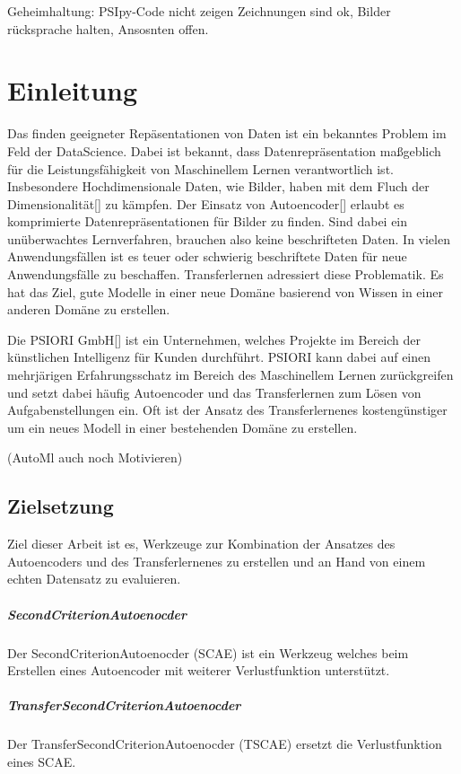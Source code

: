 \listoftodos

Geheimhaltung: PSIpy-Code nicht zeigen Zeichnungen sind ok, Bilder rücksprache halten, Ansosnten offen.
  
\chapter{Einleitung}
\label{chap:Einleitung}
	Das finden geeigneter Repäsentationen von Daten ist ein bekanntes Problem im Feld der DataScience. Dabei ist bekannt, dass Datenrepräsentation maßgeblich für die Leistungsfähigkeit von Maschinellem Lernen verantwortlich ist. Insbesondere Hochdimensionale Daten, wie Bilder, haben mit dem Fluch der Dimensionalität[] zu kämpfen. Der Einsatz von Autoencoder[] erlaubt es komprimierte Datenrepräsentationen für Bilder zu finden. Sind dabei ein unüberwachtes Lernverfahren, brauchen also keine beschrifteten Daten.
	In vielen Anwendungsfällen ist es teuer oder schwierig beschriftete Daten für neue Anwendungsfälle zu beschaffen. Transferlernen adressiert diese Problematik. Es hat das Ziel, gute Modelle in einer neue Domäne basierend von Wissen in einer anderen Domäne zu erstellen.
	
	Die PSIORI GmbH[] ist ein Unternehmen, welches Projekte im Bereich der künstlichen Intelligenz für Kunden durchführt. PSIORI kann dabei auf einen mehrjärigen Erfahrungsschatz im Bereich des Maschinellem Lernen zurückgreifen und setzt dabei häufig Autoencoder und das Transferlernen zum Lösen von Aufgabenstellungen ein. Oft ist der Ansatz des Transferlernenes kostengünstiger um ein neues Modell in einer bestehenden Domäne zu erstellen. 

 	(AutoMl auch noch Motivieren)

	\section{Zielsetzung}
	\label{sec:Zielsetzung}
	Ziel dieser Arbeit ist es, Werkzeuge zur Kombination der Ansatzes des Autoencoders und des Transferlernenes zu erstellen und an Hand von einem echten Datensatz zu evaluieren.
	\paragraph{SecondCriterionAutoenocder} Der SecondCriterionAutoenocder (SCAE) ist ein Werkzeug welches beim Erstellen eines Autoencoder mit weiterer Verlustfunktion unterstützt.  
    \paragraph{TransferSecondCriterionAutoenocder} Der TransferSecondCriterionAutoenocder (TSCAE) ersetzt die Verlustfunktion eines SCAE.
